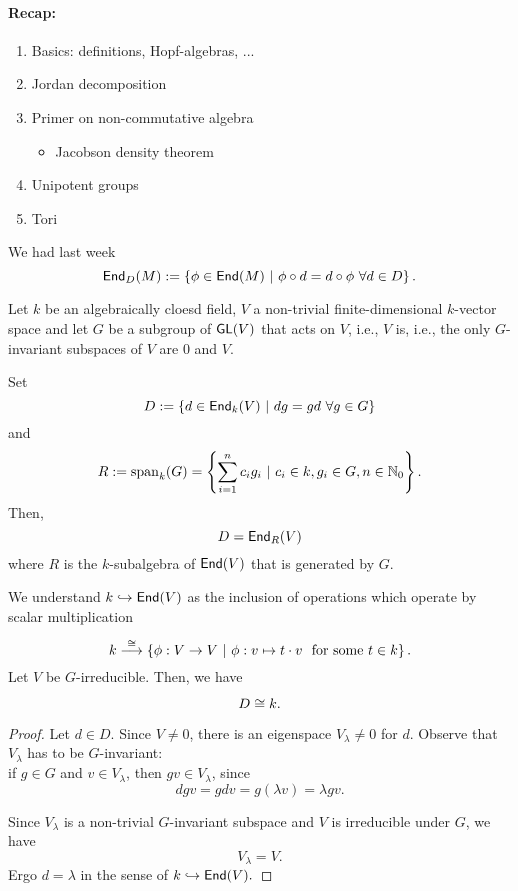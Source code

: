 \paragraph{Recap:}
\begin{enumerate}[--]
	\item Basics: definitions, Hopf-algebras, ...	
	\item	Jordan decomposition
	\item	Primer on non-commutative algebra
	\begin{itemize}
		\item 	Jacobson density theorem
	\end{itemize}
	\item Unipotent groups
	\item Tori
\end{enumerate}
We had last week
\[ \textsf{End}_D(M) := \left\lbrace\phi \in \textsf{End}(M) ~ | ~ \phi \circ d = d \circ \phi~ \forall d\in D\right\rbrace. \]

Let $k$ be an algebraically cloesd field, $V$ a non-trivial finite-dimensional $k$-vector space and let $G$ be a subgroup of $\textsf{GL}(V)$ that acts  on $V$, i.e.,
$V$ is, i.e., the only $G$-invariant subspaces of $V$ are ${0}$ and $V$.

Set
\[ D:= \left\lbrace d \in \textsf{End}_k(V) ~ | ~  dg = gd~ \forall g \in G \right\rbrace \]
and
\[ R := \mathrm{span}_k(G) = \left\lbrace\sum_{i = 1}^nc_i g_i ~ | ~ c_i \in k, g_i \in G, n \in \mathbb{N}_0\right\rbrace.\]
Then,
\[D = \textsf{End}_R(V) \]
where $R$ is the $k$-subalgebra of $\textsf{End}(V)$ that is generated by $G$.

\begin{lemma}
We understand $k \overset{}{\hookrightarrow} \textsf{End}(V)$ as the inclusion of operations which operate by scalar multiplication
\[ k \overset{\overset{}{\cong}}{\longrightarrow} \left\lbrace\phi : V \overset{}{\rightarrow} V ~ | ~ \phi : v\mapsto t \cdot v ~~ \text{for some } t \in k\right\rbrace. \]
Let $V$ be $G$-irreducible. Then, we have
\[ D \overset{}{\cong} k.\]
\end{lemma}
\begin{proof}
Let $d \in D$. Since $V \neq 0$, there is an eigenspace $V_\lambda\neq 0$ for $d$. Observe that $V_\lambda$ has to be $G$-invariant:\\
if $g \in G$ and $v \in V_\lambda$, then $gv \in V_\lambda$, since
\[ dgv = gdv = g(\lambda v) = \lambda gv. \]

Since $V_\lambda$ is a non-trivial $G$-invariant subspace and $V$ is irreducible under $G$, we have
\[ V_\lambda = V.\]
Ergo $d = \lambda$ in the sense of $k \overset{}{\hookrightarrow} \textsf{End}(V).$
\end{proof}

